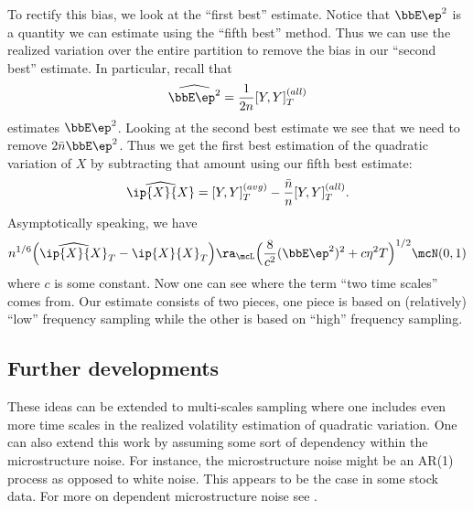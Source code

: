 \documentclass{report}
\begin{document}
To rectify this bias, we look at the ``first best'' estimate.  Notice that $\bbE \ep^2$ is a quantity we can estimate using the ``fifth best'' method.  Thus we can use the realized variation over the entire partition to remove the bias in our ``second best'' estimate.  In particular, recall that
\[
\widehat{\bbE \ep^2} = \frac{1}{2n} [Y,Y]_T^{(all)}
\]
estimates $\bbE \ep^2$.  Looking at the second best estimate we see that we need to remove $2 \bar n \bbE \ep^2$.  Thus we get the first best estimation of the quadratic variation of $X$ by subtracting that amount using our fifth best estimate:
\[
\widehat{\ip{X}{X}} = [Y,Y]_T^{(avg)} - \frac{\bar n}{n} [Y,Y]^{(all)}_T.
\]
Asymptotically speaking, we have
\[
n^{1/6} \Big( \widehat{\ip{X}{X}}_T - \ip{X}{X}_T \Big)
\ra_\mcL \Big( \frac{8}{c^2} (\bbE \ep^2)^2 + c \eta^2 T \Big)^{1/2} \mcN(0,1)
\]
where $c$ is some constant.  Now one can see where the term ``two time scales'' comes from.  Our estimate consists of two pieces, one piece is based on (relatively) ``low'' frequency sampling while the other is based on ``high'' frequency sampling.

\subsection{Further developments}

These ideas can be extended to multi-scales sampling where one includes even more time scales in the realized volatility estimation of quadratic variation.  One can also extend this work by assuming some sort of dependency within the microstructure noise.  For instance, the microstructure noise might be an AR(1) process as opposed to white noise.  This appears to be the case in some stock data.  For more on dependent microstructure noise see \cite{ait-sahalia08}.

{}

\end{document}
